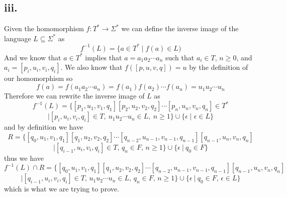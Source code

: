 \documentclass[12pt]{article}
\begin{document}
\subsection*{iii.}
Given the homomorphism $f : T^* \rightarrow \Sigma^*$ we can define the inverse
image of the language $L \subseteq \Sigma^*$ as
$$f^{-1}(L) = \{a \in T^* \mid f(a) \in L)$$
And we know that $a\in T^*$ implies that $a = a_1a_2 \cdots a_n$ such that
$a_i \in T$, $n \ge 0$, and $a_i = [p_i, u_i, v_i, q_i]$.
We also know that $f([p,u,v,q]) = u$ by the definition of our homomorphism so
$$f(a) = f(a_1a_2\cdots a_n) = f(a_1)f(a_2)\cdots f(a_n) = u_1u_2\cdots u_n$$
Therefore we can rewrite the inverse image of $L$ as
$$f^{-1}(L) =
\{[p_1,u_1,v_1,q_1][p_2,u_2,v_2,q_2]\cdots [p_n,u_n,v_n,q_n] \in T^*$$
$$\mid [p_i,u_i,v_i,q_i] \in T,\ u_1u_2\cdots u_n \in L,\ n \ge 1\} \cup
\{\epsilon \mid \epsilon \in L\}$$
and by definition we have
$$ R = \{[q_0, u_1, v_1, q_1][q_1, u_2, v_2, q_2]\cdots
[q_{n-2}, u_{n-1}, v_{n-1}, q_{n-1}][q_{n-1}, u_n, v_n, q_n]$$
$$\mid  [q_{i-1}, u_i, v_i, q_i]\in T,\, q_n\in F,\, n\geq 1\}
\cup \{\epsilon\ |\ q_0\in F\}$$
thus we have
$$f^{-1}(L)\cap R  = \{[q_0, u_1, v_1, q_1][q_1, u_2, v_2, q_2]\cdots
[q_{n-2}, u_{n-1}, v_{n-1}, q_{n-1}][q_{n-1}, u_n, v_n, q_n]$$
$$ \mid  [q_{i-1}, u_i, v_i, q_i]\in T,\, u_1u_2\cdots u_n\in L,\,
q_n\in F,\, n\geq 1\}\cup \{\epsilon\ |\ q_0\in F,\, \epsilon\in L\}$$
which is what we are trying to prove.
\end{document}
